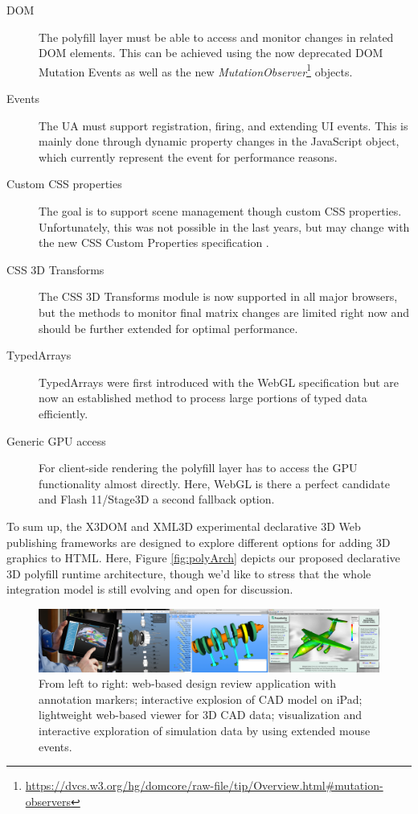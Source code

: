 \documentclass{acmsiggraph}
\begin{document}
\begin{description}
\item[DOM] The polyfill layer must be able to access and monitor changes in related DOM elements. This can be achieved using the now deprecated DOM Mutation Events as well as the new \emph{MutationObserver}\footnote{\url{https://dvcs.w3.org/hg/domcore/raw-file/tip/Overview.html\#mutation-observers}} objects.
\item[Events] The UA must support registration, firing, and extending UI events. This is mainly done through dynamic property changes in the JavaScript object, which currently represent the event for performance reasons.
\item[Custom CSS properties] The goal is to support scene management though custom CSS properties. Unfortunately, this was not possible in the last years, but may change with the new CSS Custom Properties specification \cite{CSSCustom}.
\item[CSS 3D Transforms] The CSS 3D Transforms module \cite{webkit3DCSS} is now supported in all major browsers, but the methods to monitor final matrix changes are limited right now and should be further extended for optimal performance.
\item[TypedArrays] TypedArrays \cite{TypArr12} were first introduced with the WebGL specification but are now an established method to process large portions of typed data efficiently.
\item[Generic GPU access] For client-side rendering the polyfill layer has to access the GPU functionality almost directly. Here, WebGL is there a perfect candidate and Flash 11/Stage3D a second fallback option.
\end{description}

To sum up, the X3DOM and XML3D experimental declarative 3D Web publishing frameworks are designed to explore different options for adding 3D graphics to HTML. Here, Figure \ref{fig:polyArch} depicts our proposed declarative 3D polyfill runtime architecture, though we'd like to stress that the whole integration model is still evolving and open for discussion.

\begin{figure}
  \centering
  \includegraphics[width=1.0\textwidth]{images/cad_apps.png}
  \caption{From left to right: web-based design review application with annotation markers; interactive explosion of CAD model on iPad; lightweight web-based viewer for 3D CAD data; visualization and interactive exploration of simulation data by using extended mouse events.}
  \label{fig:cadApps}
\end{figure}
\end{document}
